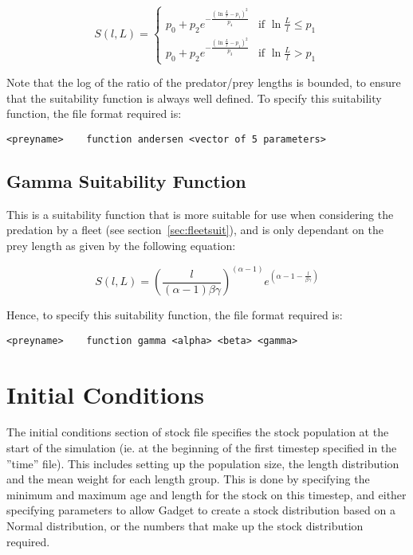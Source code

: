 \documentclass[10pt,twoside]{book}
\begin{document}
\begin{equation}\label{eq:andersensuit}
S(l, L) =
\begin{cases}
p_0 + p_2e^{-\frac{(\ln\frac{L}{l} - p_1)^2}{p_4}} & \textrm{if $\ln\frac{L}{l} \leq p_1$} \\
p_0 + p_2e^{-\frac{(\ln\frac{L}{l} - p_1)^2}{p_3}} & \textrm{if $\ln\frac{L}{l} > p_1$}
\end{cases}
\end{equation}

Note that the log of the ratio of the predator/prey lengths is bounded, to ensure that the suitability function is always well defined.  To specify this suitability function, the file format required is:

{\small\begin{verbatim}
<preyname>    function andersen <vector of 5 parameters>
\end{verbatim}}

\subsection{Gamma Suitability Function}
This is a suitability function that is more suitable for use when considering the predation by a fleet (see section~\ref{sec:fleetsuit}), and is only dependant on the prey length as given by the following equation:

\begin{equation}\label{eq:gammasuit}
S(l, L) = \left(\frac{l}{(\alpha - 1) \beta\gamma}\right) ^ {(\alpha - 1)}e ^ {(\alpha - 1 - \frac{l}{\beta\gamma})}
\end{equation}

Hence, to specify this suitability function, the file format required is:

{\small\begin{verbatim}
<preyname>    function gamma <alpha> <beta> <gamma>
\end{verbatim}}

\section{Initial Conditions}\label{sec:stockinitial}
The initial conditions section of stock file specifies the stock population at the start of the simulation (ie. at the beginning of the first timestep specified in the ''time'' file).  This includes setting up the population size, the length distribution and the mean weight for each length group.  This is done by specifying the minimum and maximum age and length for the stock on this timestep, and either specifying parameters to allow Gadget to create a stock distribution based on a Normal distribution, or the numbers that make up the stock distribution required.
\end{document}
